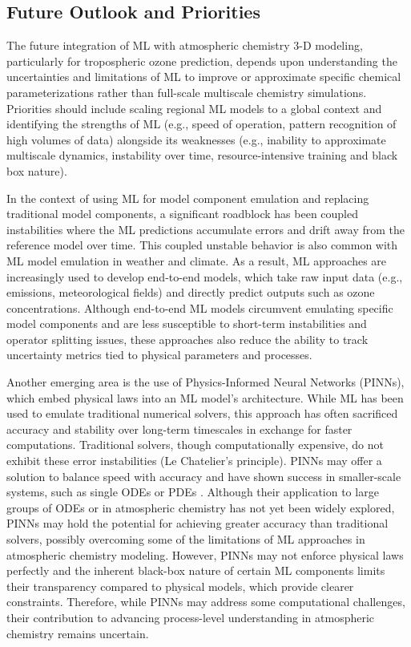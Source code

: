 \documentclass[gmd, manuscript]{copernicus}
\begin{document}
\subsection{Future Outlook and Priorities}

The future integration of ML with atmospheric chemistry 3-D modeling, particularly for tropospheric ozone prediction, depends upon understanding the uncertainties and limitations of ML to improve or approximate specific chemical parameterizations rather than full-scale multiscale chemistry simulations. Priorities should include scaling regional ML models to a global context and identifying the strengths of ML (e.g., speed of operation, pattern recognition of high volumes of data) alongside its weaknesses (e.g., inability to approximate multiscale dynamics, instability over time, resource-intensive training and black box nature). 

In the context of using ML for model component emulation and replacing traditional model components, a significant roadblock has been coupled instabilities where the ML predictions accumulate errors and drift away from the reference model over time. This coupled unstable behavior is also common with ML model emulation in weather and climate. As a result, ML approaches are increasingly used to develop end-to-end models, which take raw input data (e.g., emissions, meteorological fields) and directly predict outputs such as ozone concentrations. Although end-to-end ML models circumvent emulating specific model components and are less susceptible to short-term instabilities and operator splitting issues, these approaches also reduce the ability to track uncertainty metrics tied to physical parameters and processes.
 
Another emerging area is the use of Physics-Informed Neural Networks (PINNs), which embed physical laws into an ML model’s architecture. While ML has been used to emulate traditional numerical solvers, this approach has often sacrificed accuracy and stability over long-term timescales in exchange for faster computations. Traditional solvers, though computationally expensive, do not exhibit these error instabilities (Le Chatelier’s principle). PINNs may offer a solution to balance speed with accuracy and have shown success in smaller-scale systems, such as single ODEs or PDEs \citep{karniadakis_physics-informed_2021}. Although their application to large groups of ODEs or in atmospheric chemistry has not yet been widely explored, PINNs may hold the potential for achieving greater accuracy than traditional solvers, possibly overcoming some of the limitations of ML approaches in atmospheric chemistry modeling. However, PINNs may not enforce physical laws perfectly and the inherent black-box nature of certain ML components limits their transparency compared to physical models, which provide clearer constraints. Therefore, while PINNs may address some computational challenges, their contribution to advancing process-level understanding in atmospheric chemistry remains uncertain.
\end{document}
